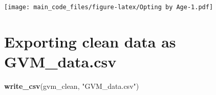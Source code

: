 \documentclass[
]{article}
\newenvironment{Shaded}{\begin{snugshade}}{\end{snugshade}}
\newcommand{\FunctionTok}[1]{\textcolor[rgb]{0.13,0.29,0.53}{\textbf{#1}}}
\newcommand{\NormalTok}[1]{#1}
\newcommand{\StringTok}[1]{\textcolor[rgb]{0.31,0.60,0.02}{#1}}
\begin{document}
\texttt{[image: main\_code\_files/figure-latex/Opting by Age-1.pdf]}

\hypertarget{exporting-clean-data-as-gvm_data.csv}{%
\section{Exporting clean data as
GVM\_data.csv}\label{exporting-clean-data-as-gvm_data.csv}}

\begin{Shaded}
\begin{Highlighting}[]
\FunctionTok{write\_csv}\NormalTok{(gvm\_clean, }\StringTok{"GVM\_data.csv"}\NormalTok{)}
\end{Highlighting}
\end{Shaded}
\end{document}
